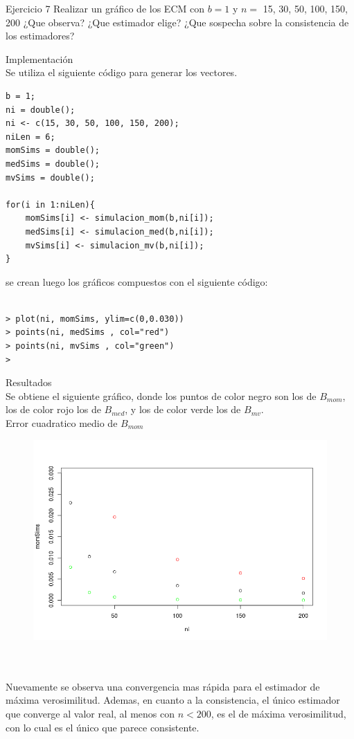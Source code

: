 \begin{section}{Ejercicio 7}
Realizar un gráfico de los ECM con $b = 1$ y $n =$ 15, 30, 50, 100, 150, 200 ¿Que observa? ¿Que
estimador elige? ¿Que sospecha sobre la consistencia de los estimadores?

\begin{subsection}{Implementación}~\\
Se utiliza el siguiente código para generar los vectores.
\begin{verbatim}
b = 1;
ni = double();
ni <- c(15, 30, 50, 100, 150, 200);
niLen = 6;
momSims = double();
medSims = double();
mvSims = double();

for(i in 1:niLen){
	momSims[i] <- simulacion_mom(b,ni[i]);
	medSims[i] <- simulacion_med(b,ni[i]);
	mvSims[i] <- simulacion_mv(b,ni[i]);
}

\end{verbatim}

se crean luego los gráficos compuestos con el siguiente código:

\begin{verbatim}

> plot(ni, momSims, ylim=c(0,0.030))
> points(ni, medSims , col="red")
> points(ni, mvSims , col="green")
> 
\end{verbatim}


\end{subsection}
\newpage
\begin{subsection}{Resultados}~\\

Se obtiene el siguiente gráfico, donde los puntos de color negro son los de $B_{mom}$, los de color rojo los de $B_{med}$, y los de color verde los de $B_{mv}$.\\


Error cuadratico medio de $B_{mom}$
\begin{figure}[H]
\includegraphics[scale=0.65]{plots/combNPlot.png}
\centering
\end{figure}
~\\
~\\
Nuevamente se observa una convergencia mas rápida para el estimador de máxima verosimilitud. Ademas, en cuanto a la consistencia, el único estimador que converge al valor real, al menos con $n<200$, es el de máxima verosimilitud, con lo cual es el único que parece consistente.
\end{subsection}
\end{section}